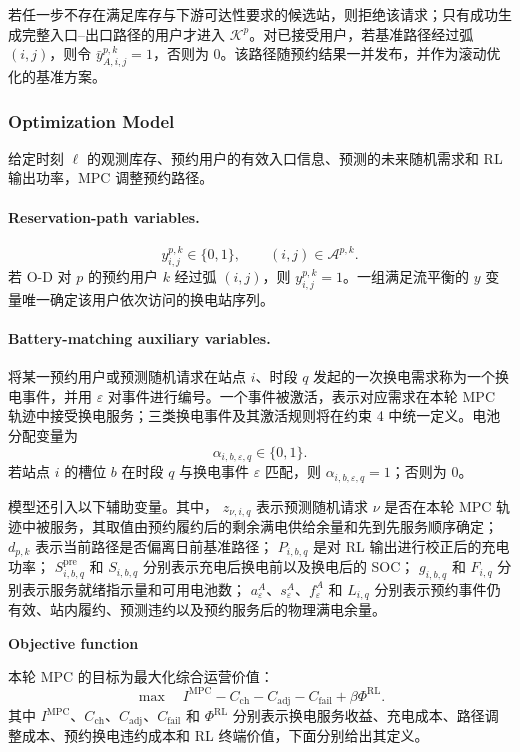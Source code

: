 \documentclass[12pt,a4paper,UTF8]{ctexart}
\begin{document}
若任一步不存在满足库存与下游可达性要求的候选站，则拒绝该请求；只有成功生成完整入口--出口路径的用户才进入 $\mathcal K^p$。对已接受用户，若基准路径经过弧 $(i,j)$，则令 $\bar y_{A,i,j}^{p,k}=1$，否则为 $0$。该路径随预约结果一并发布，并作为滚动优化的基准方案。


\subsubsection{Optimization Model}

给定时刻 $\ell$ 的观测库存、预约用户的有效入口信息、预测的未来随机需求和 RL 输出功率，MPC 调整预约路径。

\paragraph{Reservation-path variables.}
\[
y_{i,j}^{p,k}\in\{0,1\},
\qquad
(i,j)\in\mathcal A^{p,k}.
\]
若 O-D 对 $p$ 的预约用户 $k$ 经过弧 $(i,j)$，则
$y_{i,j}^{p,k}=1$。一组满足流平衡的 $y$ 变量唯一确定该用户依次访问的换电站序列。

\paragraph{Battery-matching auxiliary variables.}
将某一预约用户或预测随机请求在站点 $i$、时段 $q$ 发起的一次换电需求称为一个换电事件，并用 $\varepsilon$ 对事件进行编号。一个事件被激活，表示对应需求在本轮 MPC 轨迹中接受换电服务；三类换电事件及其激活规则将在约束 4 中统一定义。电池分配变量为
\[
\alpha_{i,b,\varepsilon,q}\in\{0,1\}.
\]
若站点 $i$ 的槽位 $b$ 在时段 $q$ 与换电事件 $\varepsilon$ 匹配，则
$\alpha_{i,b,\varepsilon,q}=1$；否则为 $0$。

模型还引入以下辅助变量。其中，
$z_{\nu,i,q}$ 表示预测随机请求 $\nu$ 是否在本轮 MPC 轨迹中被服务，其取值由预约履约后的剩余满电供给余量和先到先服务顺序确定；
$d_{p,k}$ 表示当前路径是否偏离日前基准路径；
$P_{i,b,q}$ 是对 RL 输出进行校正后的充电功率；
$S_{i,b,q}^{\mathrm{pre}}$ 和 $S_{i,b,q}$ 分别表示充电后换电前以及换电后的 SOC；
$g_{i,b,q}$ 和 $F_{i,q}$ 分别表示服务就绪指示量和可用电池数；
$a_\varepsilon^A$、$s_\varepsilon^A$、$f_\varepsilon^A$ 和 $L_{i,q}$ 分别表示预约事件仍有效、站内履约、预测违约以及预约服务后的物理满电余量。

\textbf{Objective function}

本轮 MPC 的目标为最大化综合运营价值：
\begin{equation}
\max\quad
I^{\mathrm{MPC}}-C_{\mathrm{ch}}-C_{\mathrm{adj}}-C_{\mathrm{fail}}
+\beta\Phi^{\mathrm{RL}}.
\label{eq:objective}
\end{equation}
其中 $I^{\mathrm{MPC}}$、$C_{\mathrm{ch}}$、$C_{\mathrm{adj}}$、$C_{\mathrm{fail}}$ 和 $\Phi^{\mathrm{RL}}$ 分别表示换电服务收益、充电成本、路径调整成本、预约换电违约成本和 RL 终端价值，下面分别给出其定义。
\end{document}
